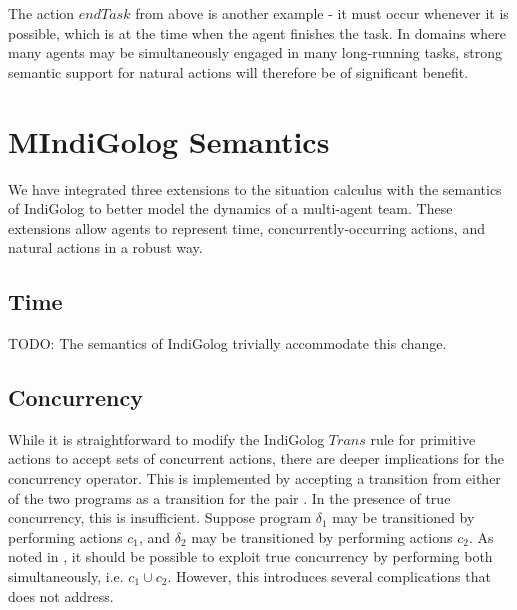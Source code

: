 The action $endTask$ from above is another example - it must occur
whenever it is possible, which is at the time when the agent finishes
the task. In domains where many agents may be simultaneously engaged
in many long-running tasks, strong semantic support for natural actions
will therefore be of significant benefit.


\section{MIndiGolog Semantics\label{sec:MIndiGolog}}

We have integrated three extensions to the situation calculus with
the semantics of IndiGolog to better model the dynamics of a multi-agent
team. These extensions allow agents to represent time, concurrently-occurring
actions, and natural actions in a robust way.


\subsection{Time}

TODO: The semantics of IndiGolog trivially accommodate this change.\citet{Reiter98seq_temp_golog}


\subsection{Concurrency}

While it is straightforward to modify the IndiGolog $Trans$ rule
for primitive actions to accept sets of concurrent actions, there
are deeper implications for the concurrency operator. This is implemented
by accepting a transition from either of the two programs as a transition
for the pair \citet{giacomo00congolog}. In the presence of true concurrency,
this is insufficient. Suppose program $\delta_{1}$ may be transitioned
by performing actions $c_{1}$, and $\delta_{2}$ may be transitioned
by performing actions $c_{2}$. As noted in \citet{pinto99tcongolog},
it should be possible to exploit true concurrency by performing both
simultaneously, i.e. $c_{1}\cup c_{2}$. However, this introduces
several complications that \citet{pinto99tcongolog} does not address.

